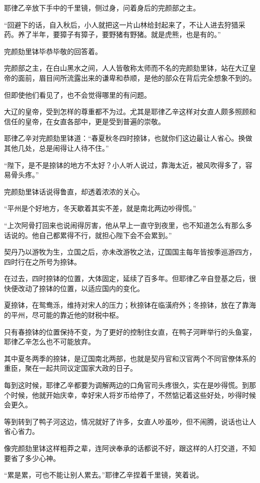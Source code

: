 耶律乙辛放下手中的千里镜，侧过身，问着身后的完颜部之主。

“回避下的话，自入秋后，小人就把这一片山林给封起来了，不让人进去狩猎采药。养了半年，要獐子有獐子，要野猪有野猪。就是虎熊，也是有的。”

完颜劾里钵毕恭毕敬的回答着。

完颜部之主，在白山黑水之间，人人皆敬称太师而不名的完颜劾里钵，站在大辽皇帝的面前，眉目间所流露出来的谦卑和恭顺，是他的部众在背后完全想象不到的。

但即使他们看见了，也不会觉得哪里的有问题。

大辽的皇帝，受到怎样的尊重都不为过。尤其是耶律乙辛这样对女直人颇多照顾和信任的皇帝，在女直各部中，更是受到普遍的崇敬。

耶律乙辛对完颜劾里钵道：“春夏秋冬四时捺钵，也就你们这边最让人省心。换做其他几处，总是闹得让人待不住。”

“陛下，是不是捺钵的地方不太好？小人听人说过，靠海太近，被风吹得多了，容易骨头疼。”

完颜劾里钵话说得鲁直，却透着浓浓的关心。

“平州是个好地方，冬天歇着其实不差，就是南北两边吵得慌。”

“上次阿骨打回来也说闹得厉害，他从早上一直守到夜里，也不知道怎么有那么多话说的。他自己都累得不行，就担心陛下会不会累到。”

契丹乃以游牧为生，立国之后，亦未改游牧之法，辽国国主每年皆按季巡游四方，四时行在之所号为捺钵。

在过去，四时捺钵的位置，大体固定，延续了百多年。但耶律乙辛自登基之后，很快便改动了捺钵的位置，以适应国内的变化。

夏捺钵，在鸳鸯泺，维持对宋人的压力；秋捺钵在临潢府外；冬捺钵，放在了靠海的平州，尽可能的靠近他的财税中枢。

只有春捺钵的位置保持不变，为了更好的控制住女直，在鸭子河畔举行的头鱼宴，耶律乙辛怎么也不可能放弃。

其中夏冬两季的捺钵，是辽国南北两部，也就是契丹官和汉官两个不同官僚体系的重臣，聚在一起共同议定国家大政的日子。

每到这时候，耶律乙辛都要为调解两边的口角官司头疼很久，实在是吵得慌。到那个时候，他就开始庆幸，幸好宋人将岁币给停了，不然惦记着这些好处，吵得时候会更久。

等到转到了鸭子河这边，情况就好了许多，女直人吵虽吵，但不闹腾，说话也让人省心省力。

像完颜劾里钵这样粗莽之辈，连阿谀奉承的话都说不好，跟这样的人打交道，不知要省了多少心神。

“累是累，可也不能让别人累去。”耶律乙辛捏着千里镜，笑着说。

